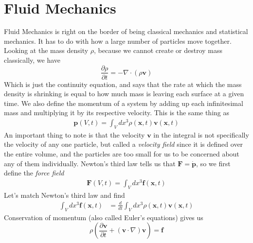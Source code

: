 \section{Fluid Mechanics}
Fluid Mechanics is right on the border of being classical mechanics and statistical mechanics. It has to do with how a large number of particles move together. Looking at the mass density $\rho$, because we cannot create or destroy mass classically, we have
\begin{equation}\label{masscon}
\frac{\partial\rho}{\partial t} = -\nabla\cdot (\rho\textbf{v})
\end{equation}
Which is just the continuity equation, and says that the rate at which the mass density is shrinking is equal to how much mass is leaving each surface at a given time. We also define the momentum of a system by adding up each infinitesimal mass and multiplying it by its respective velocity. This is the same thing as 
\begin{align}
    \textbf{p}(V,t) = \int_V dx^3 \rho(\textbf{x},t)\textbf{v}(\textbf{x},t)
\end{align}
An important thing to note is that the velocity $\textbf{v}$ in the integral is not specifically the velocity of any one particle, but called a \emph{velocity field} since it is defined over the entire volume, and the particles are too small for us to be concerned about any of them individually. Newton's third law tells us that $\textbf{F} = \dot{\textbf{p}}$, so we first define the \emph{force field}
\begin{align}
    \textbf{F}(V,t) = \int_V dx^3 \textbf{f}(\textbf{x},t)
\end{align}
Let's match Newton's third law and find
\begin{align}
    \int_V dx^3 \textbf{f}(\textbf{x},t) &= \frac{d}{dt}\int_V dx^3 \rho(\textbf{x},t)\textbf{v}(\textbf{x},t)
\end{align}
Conservation of momentum (also called Euler's equations) gives us
\begin{equation}\label{momcon}
\rho\left({\frac{\partial\textbf{v}}{\partial t} + (\textbf{v}\cdot\nabla)\textbf{v}}\right) = \textbf{f}
\end{equation}

